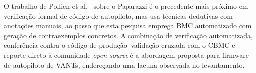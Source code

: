 O trabalho de Pollien et al.~\cite{Pollien2021} sobre o Paparazzi é o precedente
mais próximo em verificação formal de código de autopiloto, mas usa técnicas
dedutivas com anotações manuais, ao passo que esta pesquisa emprega BMC
automatizado com geração de contraexemplos concretos. A combinação de verificação
automatizada, conferência contra o código de produção, validação cruzada com o
CBMC e reporte direto à comunidade \textit{open-source} é a abordagem proposta
para firmware de autopiloto de VANTs, endereçando uma lacuna observada no
levantamento.
